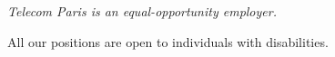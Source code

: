 
\begin{center}
\it
\color{black!80}
Telecom Paris is an equal-opportunity employer. 

All our positions are open to individuals with disabilities.    
\end{center}
